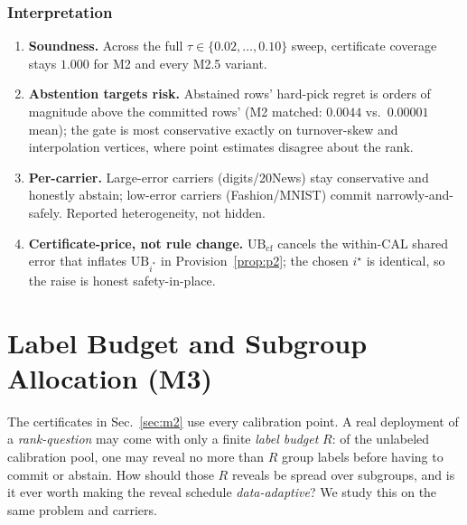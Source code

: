 \documentclass{article}
\begin{document}
\subsubsection{Interpretation}
\begin{enumerate}
\item \textbf{Soundness.} Across the full $\tau\in\{0.02,\dots,0.10\}$ sweep,
certificate coverage stays $1.000$ for M2 and every M2.5 variant.
\item \textbf{Abstention targets risk.} Abstained rows' hard-pick regret is orders of
magnitude above the committed rows' (M2 matched: $0.0044$ vs.\ $0.00001$ mean); the gate is
most conservative exactly on turnover-skew and interpolation vertices, where point estimates
disagree about the rank.
\item \textbf{Per-carrier.} Large-error carriers (digits/20News) stay conservative and
honestly abstain; low-error carriers (Fashion/MNIST) commit narrowly-and-safely. Reported
heterogeneity, not hidden.
\item \textbf{Certificate-price, not rule change.} $\mathrm{UB}_{\mathrm{cf}}$ cancels the
within-CAL shared error that inflates $\mathrm{UB}_{i^*}$ in Provision~\ref{prop:p2}; the
chosen $i^\star$ is identical, so the raise is honest safety-in-place.
\end{enumerate}

\section{Label Budget and Subgroup Allocation (M3)}
\label{sec:m3}

The certificates in Sec.~\ref{sec:m2} use every calibration point. A real deployment of a
\emph{rank-question} may come with only a finite \emph{label budget} $R$: of the unlabeled
calibration pool, one may reveal no more than $R$ group labels before having to commit or
abstain. How should those $R$ reveals be spread over subgroups, and is it ever worth making
the reveal schedule \emph{data-adaptive}? We study this on the same problem and carriers.
\end{document}
